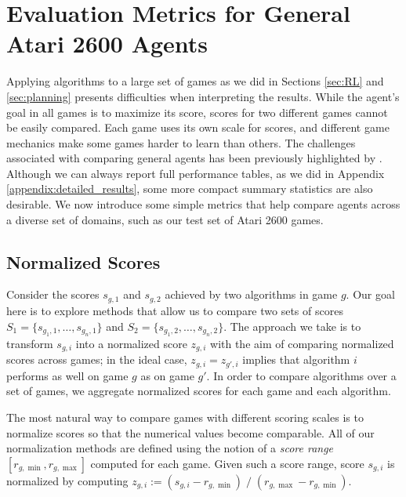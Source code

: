 \documentclass[twoside,11pt]{article}
\begin{document}
\section{Evaluation Metrics for General Atari 2600 Agents}
\label{sec:comparison}

Applying algorithms to a large set of games as we did in Sections \ref{sec:RL} and 
\ref{sec:planning} presents difficulties when interpreting the results.
While the agent's goal in all games is to maximize its score, scores for two different games cannot be easily compared. 
Each game uses its own scale for scores, and different game mechanics make some games harder to learn than others. 
The challenges associated with comparing general agents has been previously highlighted by .
Although we can always report full performance tables, as we did in Appendix \ref{appendix:detailed_results}, some more compact summary statistics are also desirable.
We now introduce some simple metrics that help compare agents across a diverse set of domains, such as our test set of Atari 2600 games.

\subsection{Normalized Scores}

Consider the scores $s_{g,1}$ and $s_{g,2}$ achieved by two algorithms in game $g$. Our goal here is to explore methods that allow us to compare two sets of scores $S_1 = \{ s_{g_1, 1}, \dots, s_{g_n, 1} \}$ and $S_2 = \{ s_{g_1, 2}, \dots, s_{g_n, 2} \}$. The approach we take is to transform $s_{g,i}$ into a normalized score $z_{g,i}$ with the aim of comparing normalized scores across games; in the ideal case, $z_{g,i} = z_{g',i}$ implies that algorithm $i$ performs as well on game $g$ as on game $g'$. In order to compare algorithms over a set of games, we aggregate normalized scores for each game and each algorithm. 

The most natural way to compare games with different scoring scales is to normalize scores so that the numerical values become comparable. All of our normalization methods are defined using the notion of a  \emph{score range} $[r_{g,\min}, r_{g,\max} ]$ computed for each game. Given such a score range, score $s_{g,i}$ is normalized by computing $z_{g,i} := (s_{g,i} - r_{g,\min}) \; / \; (r_{g,\max} - r_{g,\min})$.
\end{document}
